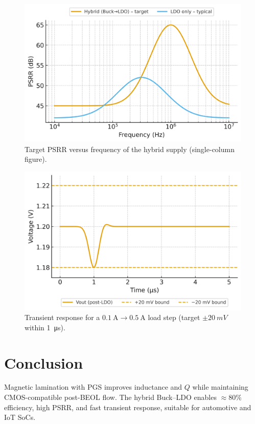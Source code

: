 \documentclass[journal]{IEEEtran}
\begin{document}
\begin{figure}[t]
  \centering
  \includegraphics[width=\columnwidth]{fig/fig4_psrr_target.png}
  \caption{Target PSRR versus frequency of the hybrid supply (single-column figure).}
  \label{fig:psrr}
\end{figure}

\begin{figure}[t]
  \centering
  \includegraphics[width=\columnwidth]{fig/fig5_transient_response.png}
  \caption{Transient response for a $0.1~\mathrm{A}\rightarrow0.5~\mathrm{A}$ load step (target $\pm\SI{20}{mV}$ within \SI{1}{\micro\second}).}
  \label{fig:transient}
\end{figure}

\section{Conclusion}
Magnetic lamination with PGS improves inductance and $Q$ while maintaining CMOS-compatible post-BEOL flow. The hybrid Buck--LDO enables $\approx\!80\%$ efficiency, high PSRR, and fast transient response, suitable for automotive and IoT SoCs.
\end{document}
